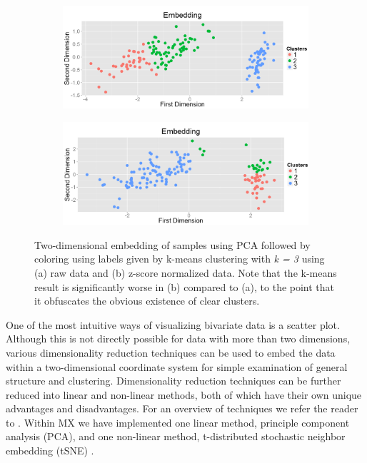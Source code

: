 \documentclass[twoside,leqno,twocolumn]{article}
\begin{document}
\begin{figure}[t]
	\centering
	\begin{subfigure}[t]{0.48\textwidth}
		\includegraphics[width=\textwidth,valign=t]{Figures/Iris/EmbedRaw.png}
		\subcaption{}
		\label{fig:FigEmbedRaw}
	\end{subfigure}
	\begin{subfigure}[t]{0.48\textwidth}
		\includegraphics[width=\textwidth,valign=t]{Figures/Iris/EmbedZ.png}
		\subcaption{}
		\label{fig:FigEmbedZ}
	\end{subfigure}
	\caption{Two-dimensional embedding of samples using PCA followed by coloring using labels given by k-means clustering with \textit{k = 3} using (a) raw data and (b) z-score normalized data. Note that the k-means result is significantly worse in (b) compared to (a), to the point that it obfuscates the obvious existence of clear clusters.}
	\label{fig:FigEmbedding}
\end{figure}

One of the most intuitive ways of visualizing bivariate data is a scatter plot. Although this is not directly possible for data with more than two dimensions, various dimensionality reduction techniques can be used to embed the data within a two-dimensional coordinate system for simple examination of general structure and clustering. Dimensionality reduction techniques can be further reduced into linear and non-linear methods, both of which have their own unique advantages and disadvantages. For an overview of techniques we refer the reader to \cite{van2009dimensionality}. Within MX we have implemented one linear method, principle component analysis (PCA), and one non-linear method, t-distributed stochastic neighbor embedding (tSNE) \cite{van2008visualizing}.
\end{document}
